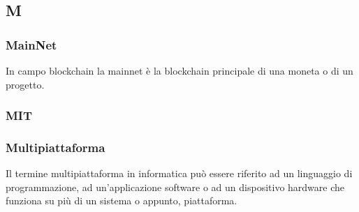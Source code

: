 \subsection*{\textbf{\hfill \Huge{M} \hfill}} 
\subsubsection*{MainNet}
In campo blockchain la mainnet è la blockchain principale di una moneta o di un progetto.
\subsubsection*{MIT}

\subsubsection*{Multipiattaforma}
Il termine multipiattaforma in informatica può essere riferito ad un linguaggio di programmazione, ad un'applicazione software o ad un dispositivo hardware che funziona su più di un sistema o appunto, piattaforma.
